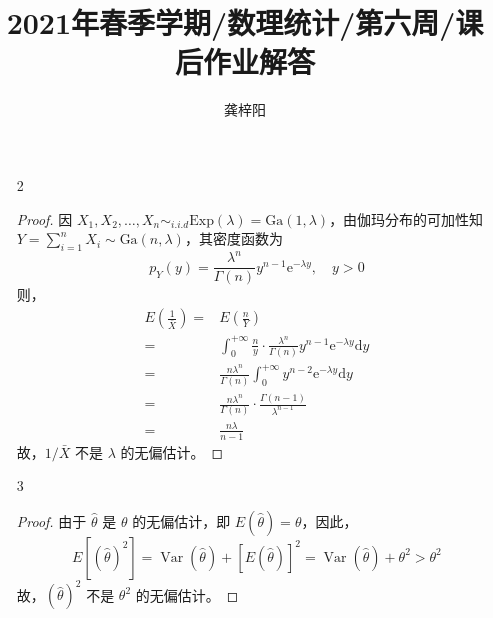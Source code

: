 \documentclass[normal,founder,mtpro2,cn]{elegantnote}
\title{2021年春季学期/数理统计/第六周/课后作业解答}
\author{龚梓阳}
\date{\zhtoday}
\begin{document}
\maketitle
\begin{enumerate}
    \item[2]
        \begin{proof}
            因 $X_{1},X_{2},\ldots,X_{n}\sim_{i.i.d}\text{Exp}(\lambda)=\text{Ga}(1,\lambda)$，由伽玛分布的可加性知 $Y=\sum_{i=1}^{n}X_{i}\sim\text{Ga}(n,\lambda)$，其密度函数为
            \begin{equation*}
                p_{Y}(y)=\frac{\lambda^{n}}{\Gamma(n)}y^{n-1}\mathrm{e}^{-\lambda y},\quad y>0
            \end{equation*}
            则，
            \begin{equation*}
                \begin{aligned}
                    E\left(\frac{1}{\bar{X}}\right)= & E\left(\frac{n}{Y}\right)                                                                                \\
                    =                                & \int_{0}^{+\infty}\frac{n}{y}\cdot\frac{\lambda^{n}}{\Gamma(n)}y^{n-1}\mathrm{e}^{-\lambda y}\mathrm{d}y \\
                    =                                & \frac{n\lambda^{n}}{\Gamma(n)}\int_{0}^{+\infty}y^{n-2}\mathrm{e}^{-\lambda y}\mathrm{d}y                \\
                    =                                & \frac{n\lambda^{n}}{\Gamma(n)}\cdot\frac{\Gamma(n-1)}{\lambda^{n-1}}                                     \\
                    =                                & \frac{n\lambda}{n-1}
                \end{aligned}
            \end{equation*}
            故，$1/\bar{X}$ 不是 $\lambda$ 的无偏估计。
        \end{proof}
    \item[3]
        \begin{proof}
            由于 $\hat{\theta}$ 是 $\theta$ 的无偏估计，即 $E(\hat{\theta})=\theta$，因此，
            \begin{equation*}
                E\left[(\hat{\theta})^{2}\right]=\operatorname{Var}(\hat{\theta})+[E(\hat{\theta})]^{2}=\operatorname{Var}(\hat{\theta})+\theta^{2}>\theta^{2}
            \end{equation*}
            故，$(\hat{\theta})^{2}$ 不是 $\theta^{2}$ 的无偏估计。

\end{proof}
\end{enumerate}
\end{document}
